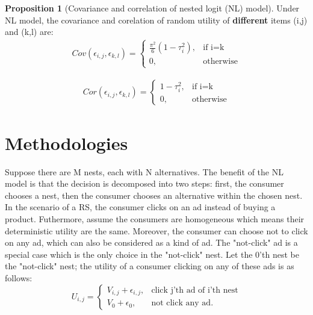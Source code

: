 \documentclass[12pt]{article}
\theoremstyle{definition}
\newtheorem{prop}[theorem]{Proposition}
\begin{document}
\begin{sloppypar}
\begin{prop}[Covariance and correlation of nested logit (NL) model]\label{prop:3}
    Under NL model, the covariance and corelation of random utility of \textbf{different} items (i,j) and (k,l) are:
    \begin{align*}
        Cov(\epsilon_{i,j}, \epsilon_{k,l}) = 
        \begin{cases}
            \frac{\pi^2}{6}(1-\tau_i^2), & \text{if i=k} \\
            0, & \text{otherwise}
        \end{cases}
    \end{align*}

    \begin{align*}
        Cor(\epsilon_{i,j}, \epsilon_{k,l}) =
        \begin{cases}
            1-\tau_i^2, & \text{if i=k} \\
            0, & \text{otherwise}
        \end{cases}
    \end{align*}
\end{prop}

\section{Methodologies}
Suppose there are M nests, each with N alternatives. The benefit of the NL model is that the decision is decomposed into two steps: first, the consumer chooses a nest, then the consumer chooses an alternative within the chosen nest. In the scenario of a RS, the consumer clicks on an ad instead of buying a product. Futhermore, assume the consumers are homogeneous which means their deterministic utility are the same. Moreover, the consumer can choose not to click on any ad, which can also be considered as a kind of ad. The "not-click" ad is a special case which is the only choice in the "not-click" nest. Let the 0'th nest be the "not-click" nest; the utility of a consumer clicking on any of these ads is as follows:
\begin{equation}\label{eq: utility}
    U_{i,j} = 
    \begin{cases}
        V_{i,j} + \epsilon_{i,j}, &\text{click j'th ad of i'th nest} \\
        V_0 + \epsilon_0, &\text{not click any ad}.     
    \end{cases}
\end{equation}


\end{sloppypar}
\end{document}
